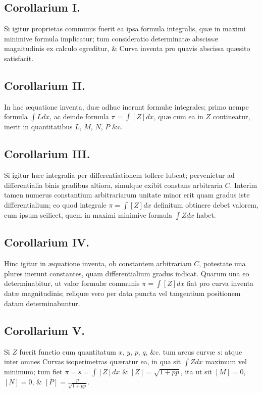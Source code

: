 \subsection*{Corollarium I.}
Si igitur proprietas communis fuerit ea ipsa formula integralis, quæ in maximi minimive formula implicatur; tum consideratio determinatæ abscissæ magnitudinis ex calculo egreditur, \& Curva inventa pro quavis abscissa quæsito satisfacit.

\subsection*{Corollarium II.}
In hac æquatione inventa, duæ adhuc inerunt formulæ integrales; primo nempe formula $\int Ldx$, ac deinde formula $\pi=\int[Z]dx$, quæ cum ea in $Z$ contineatur, inerit in quantitatibus $L$, $M$, $N$, $P$ \&c.

\subsection*{Corollarium III.}
Si igitur hæc integralia per differentiationem tollere lubeat; pervenietur ad differentialia binis gradibus altiora, simulque exibit constans arbitraria $C$. Interim tamen numerus constantium arbitrariarum unitate minor erit quam gradus iste differentialium; eo quod integrale $\pi=\int[Z]dx$ definitum obtinere debet valorem, eum ipsum scilicet, quem in maximi minimive formula $\int Zdx$ habet.

\subsection*{Corollarium IV.}
Hinc igitur in æquatione inventa, ob constantem arbitrariam $C$, potestate una plures inerunt constantes, quam differentialium gradus indicat. Quarum una eo determinabitur, ut valor formulæ communis $\pi=\int[Z]dx$ fiat pro curva inventa datæ magnitudinis; reliquæ vero per data puncta vel tangentium positionem datam determinabuntur.

\subsection*{Corollarium V.}
Si $Z$ fuerit functio cum quantitatum $x$, $y$, $p$, $q$, \&c. tum arcus curvæ $s$: atque inter omnes Curvas isoperimetras quæratur ea, in qua sit $\int Zdx$ maximum vel minimum; tum fiet $\pi=s=\int[Z]dx$ \& $[Z]=\sqrt{1+pp}$, ita ut sit $[M]=0$, $[N]=0$, \& $[P]=\frac p{\sqrt{1+pp}}$.

